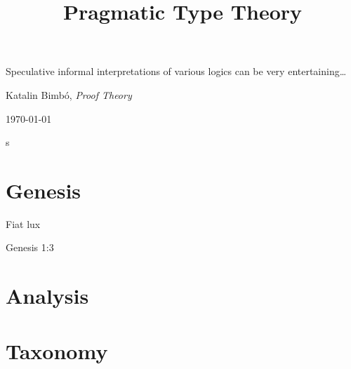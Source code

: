 \documentclass[12pt,book]{memoir}
\begin{document}
\nocite{*}
\title{Pragmatic Type Theory}
\date{}
\titlingpageend{\clearpage}{\clearpage}
\begin{titlingpage}
  \maketitle
\epigraph{Speculative informal interpretations of various logics can be very entertaining\ldots}{Katalin Bimbó, \textit{Proof Theory} \parencite{bimbo2014proof}}
\end{titlingpage}

\today
\newpage

\hypertarget{toc}{s}
\tableofcontents*

\mainmatter

\nopartblankpage
\makeatletter
\renewcommand*{\afterpartskip}{\par\vskip2ex
\@afterindentfalse} %
\makeatother

\part{Genesis}
\epigraph{Fiat lux}
         {Genesis 1:3}
\newpage






\part{Analysis}











\part{Taxonomy}





\end{document}
